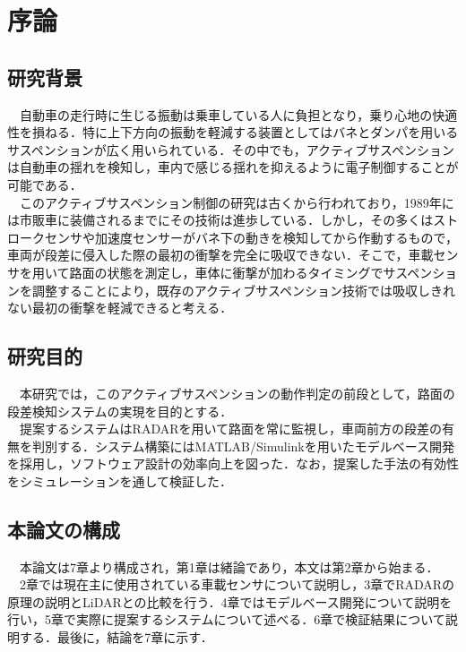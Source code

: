 \chapter{序論}
\section{研究背景}
　自動車の走行時に生じる振動は乗車している人に負担となり，乗り心地の快適性を損ねる．特に上下方向の振動を軽減する装置としてはバネとダンパを用いるサスペンションが広く用いられている．その中でも，アクティブサスペンションは自動車の揺れを検知し，車内で感じる揺れを抑えるように電子制御することが可能である．\\
　このアクティブサスペンション制御の研究は古くから行われており，1989年には市販車に装備されるまでにその技術は進歩している\cite{active_suspension}．しかし，その多くはストロークセンサや加速度センサーがバネ下の動きを検知してから作動するもので，車両が段差に侵入した際の最初の衝撃を完全に吸収できない．そこで，車載センサを用いて路面の状態を測定し，車体に衝撃が加わるタイミングでサスペンションを調整することにより，既存のアクティブサスペンション技術では吸収しきれない最初の衝撃を軽減できると考える．\\

\section{研究目的}
　本研究では，このアクティブサスペンションの動作判定の前段として，路面の段差検知システムの実現を目的とする．\\
　提案するシステムはRADARを用いて路面を常に監視し，車両前方の段差の有無を判別する．システム構築にはMATLAB/Simulinkを用いたモデルベース開発を採用し，ソフトウェア設計の効率向上を図った．なお，提案した手法の有効性をシミュレーションを通して検証した．\\

\section{本論文の構成}
　本論文は7章より構成され，第1章は緒論であり，本文は第2章から始まる．\\
　2章では現在主に使用されている車載センサについて説明し，3章でRADARの原理の説明とLiDARとの比較を行う．4章ではモデルベース開発について説明を行い，5章で実際に提案するシステムについて述べる．6章で検証結果について説明する．最後に，結論を7章に示す．\\
